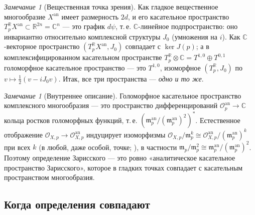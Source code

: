 \documentclass[11pt,a4paper]{article}
\theoremstyle{plain}
\theoremstyle{definition}
\theoremstyle{remark}
\newtheorem{remark}[theorem]{Замечание}
\renewcommand{\C}{\mathbb{C}}
\newcommand{\R}{\mathbb{R}}
\newcommand{\cO}{\mathcal{O}}
\newcommand{\mm}{\mathfrak{m}}
\newcommand{\an}{\mathrm{an}}
\begin{document}
\begin{remark}[Вещественная точка зрения]
Как гладкое вещественное многообразие $X^{\an}$ имеет размерность $2d$, и его касательное
пространство $T^{\R}_pX^{\an}\subset\R^{2n}=\C^n$ --- это график $d\psi$, т.\,е. $\C$-линейное
подпространство: оно инвариантно относительно комплексной структуры $J_0$ (умножения на $i$).
Как $\C$-векторное пространство $(T_p^\R X^{\an},J_0)$ совпадает с $\ker J(p)$; а в
комплексифицированном касательном пространстве $T^\R_p\otimes\C=T^{1,0}\oplus T^{0,1}$
голоморфное касательное пространство --- это $T^{1,0}$, изоморфное $(T^\R_p,J_0)$ по
$v\mapsto\frac12(v-iJ_0v)$. Итак, все три пространства --- \emph{одно и то же}.
\end{remark}

\begin{remark}[Внутреннее описание]
Голоморфное касательное пространство комплексного многообразия --- это пространство
дифференцирований $\cO^{\an}_{p}\to\C$ кольца ростков голоморфных функций, т.\,е.
$(\mm^{\an}_p/(\mm^{\an}_p)^2)^*$. Естественное отображение $\cO_{X,p}\to\cO^{\an}_{X,p}$ индуцирует
изоморфизмы $\cO_{X,p}/\mm_p^k\cong\cO^{\an}_{X,p}/(\mm^{\an}_p)^k$ при всех $k$ (в любой, даже
особой, точке; \cite{Se}), в частности $\mm_p/\mm_p^2\cong\mm_p^{\an}/(\mm_p^{\an})^2$. Поэтому
определение Зарисского --- это ровно «аналитическое касательное пространство Зарисского», которое
в гладких точках совпадает с касательным пространством многообразия.
\end{remark}

\subsection{Когда определения совпадают}
\end{document}
